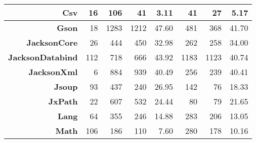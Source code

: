\begin{table*}[ht!]
{\begin{tabular}{|r|r|rrr|rrr|}
            \textbf{Csv}                            & 16                                     & \multicolumn{1}{r|}{106}  & \multicolumn{1}{r|}{41}   & 3.11                  & \multicolumn{1}{r|}{41}   & \multicolumn{1}{r|}{27}   & 5.17                  \\ \hline
            \textbf{Gson}                           & 18                                     & \multicolumn{1}{r|}{1283} & \multicolumn{1}{r|}{1212} & 47.60                 & \multicolumn{1}{r|}{481}  & \multicolumn{1}{r|}{368}  & 41.70                 \\ \hline
            \textbf{JacksonCore}                    & 26                                     & \multicolumn{1}{r|}{444}  & \multicolumn{1}{r|}{450}  & 32.98                 & \multicolumn{1}{r|}{262}  & \multicolumn{1}{r|}{258}  & 34.00                 \\ \hline
            \textbf{JacksonDatabind}                & 112                                    & \multicolumn{1}{r|}{718}  & \multicolumn{1}{r|}{666}  & 43.92                 & \multicolumn{1}{r|}{1183} & \multicolumn{1}{r|}{1123} & 40.74                 \\ \hline
            \textbf{JacksonXml}                     & 6                                      & \multicolumn{1}{r|}{884}  & \multicolumn{1}{r|}{939}  & 40.49                 & \multicolumn{1}{r|}{256}  & \multicolumn{1}{r|}{239}  & 40.41                 \\ \hline
            \textbf{Jsoup}                          & 93                                     & \multicolumn{1}{r|}{437}  & \multicolumn{1}{r|}{240}  & 26.95                 & \multicolumn{1}{r|}{142}  & \multicolumn{1}{r|}{76}   & 18.33                 \\ \hline
            \textbf{JxPath}                         & 22                                     & \multicolumn{1}{r|}{607}  & \multicolumn{1}{r|}{532}  & 24.44                 & \multicolumn{1}{r|}{80}   & \multicolumn{1}{r|}{79}   & 21.65                 \\ \hline
            \textbf{Lang}                           & 64                                     & \multicolumn{1}{r|}{355}  & \multicolumn{1}{r|}{246}  & 14.88                 & \multicolumn{1}{r|}{283}  & \multicolumn{1}{r|}{206}  & 13.05                 \\ \hline
            \textbf{Math}                           & 106                                    & \multicolumn{1}{r|}{186}  & \multicolumn{1}{r|}{110}  & 7.60                  & \multicolumn{1}{r|}{280}  & \multicolumn{1}{r|}{178}  & 10.16                 \\ \hline

\end{tabular}}
\end{table*}
